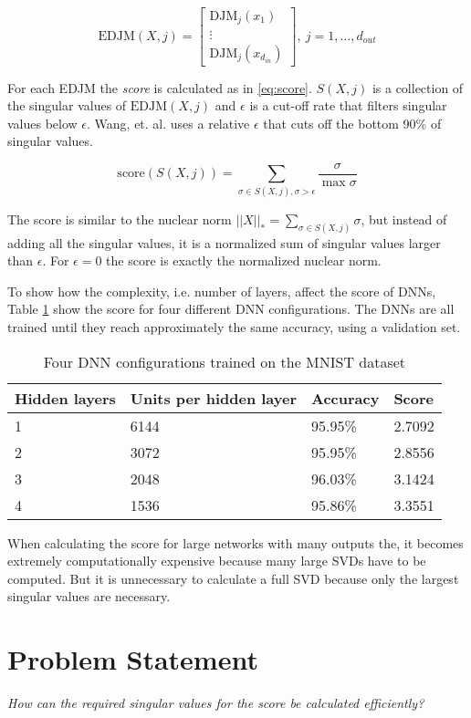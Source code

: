 \begin{equation} \label{eq:edjm}
\mathrm{EDJM}(X, j) =
\begin{bmatrix}
\mathrm{DJM}_{j}(x_1) \\
\vdots \\
\mathrm{DJM}_{j}(x_{d_{in}})
\end{bmatrix},\ j=1,\dots,d_{out}
\end{equation}

For each EDJM the \textit{score} is calculated as in \eqref{eq:score}. $S(X, j)$ is a collection of the singular values of $\mathrm{EDJM}(X, j)$ and $\epsilon$ is a cut-off rate that filters singular values below $\epsilon$. Wang, et. al. uses a relative $\epsilon$ that cuts off the bottom 90\% of singular values.

\begin{equation} \label{eq:score}
    \mathrm{score}(S(X, j)) =  \sum_{\sigma \in S(X, j), \sigma > \epsilon} \frac{\sigma}{\max{\sigma}}
\end{equation}

The score is similar to the nuclear norm $||X||_* = \sum_{\sigma \in S(X, j)} \sigma$, but instead of adding all the singular values, it is a normalized sum of singular values larger than $\epsilon$. For $\epsilon=0$ the score is exactly the normalized nuclear norm.

To show how the complexity, i.e. number of layers, affect the score of DNNs, Table \ref{tab:dnn:score} show the score for four different DNN configurations. The DNNs are all trained until they reach approximately the same accuracy, using a validation set.

\begin{table}[H]
    \centering
    \begin{tabular}{|l|l|l|l|} \hline
        Hidden layers & Units per hidden layer & Accuracy & Score \\ \hline
        1 & 6144 & 95.95\% & 2.7092 \\ \hline
        2 & 3072 & 95.95\% & 2.8556 \\ \hline
        3 & 2048 & 96.03\% & 3.1424 \\ \hline
        4 & 1536 & 95.86\% & 3.3551 \\ \hline
    \end{tabular}
    \caption{Four DNN configurations trained on the MNIST dataset}
    \label{tab:dnn:score}
\end{table}

When calculating the score for large networks with many outputs the, it becomes extremely computationally expensive because many large SVDs have to be computed. But it is unnecessary to calculate a full SVD because only the largest singular values are necessary.

\section{Problem Statement}


\textit{How can the required singular values for the score be calculated efficiently?}
